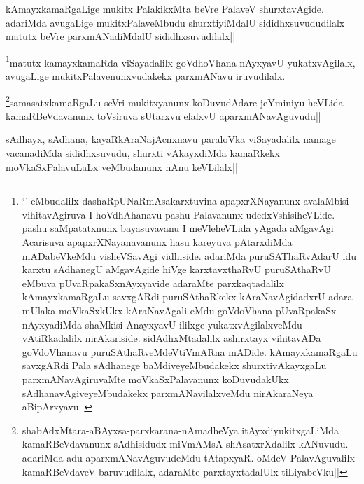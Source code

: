 
\begin{artha}
kAmayxkamaRgaLige mukitx PalakikxMta beVre PalaveV shurxtavAgide. adariMda avugaLige mukitxPalaveMbudu shurxtiyiMdalU sididhxsuvududilalx matutx beVre parxmANadiMdalU sididhxsuvudilalx||
\end{artha}

\begin{artha}
\footnote{`\stext' eMbudalilx dashaRpUNaRmAsakarxtuvina apapxrXNayanunx avalaMbisi vihitavAgiruva I hoVdhAhanavu pashu Palavanunx udedxVshisiheVLide. pashu saMpatatxnunx bayasuvavanu I meVleheVLida yAgada aMgavAgi Acarisuva apapxrXNayanavanunx hasu kareyuva pAtarxdiMda mADabeVkeMdu visheVSavAgi vidhiside. adariMda puruSAThaRvAdarU idu karxtu sAdhanegU aMgavAgide hiVge karxtavxthaRvU puruSAthaRvU eMbuva pUvaRpakaSxnAyxyavide adaraMte parxkaqtadalilx kAmayxkamaRgaLu savxgARdi puruSAthaRkekx kAraNavAgidadxrU adara mUlaka moVkaSxkUkx kAraNavAgali eMdu goVdoVhana pUvaRpakaSx nAyxyadiMda shaMkisi AnayxyavU ililxge yukatxvAgilalxveMdu vAtiRkadalilx nirAkariside. sidAdhxMtadalilx ashirxtayx vihitavADa goVdoVhanavu puruSAthaRveMdeVtiVmARna mADide. kAmayxkamaRgaLu savxgARdi Pala sAdhanege baMdiveyeMbudakekx shurxtivAkayxgaLu parxmANavAgiruvaMte moVkaSxPalavanunx koDuvudakUkx sAdhanavAgiveyeMbudakekx parxmANavilalxveMdu nirAkaraNeya aBipArxyavu||}matutx kamayxkamaRda viSayadalilx goVdhoVhana nAyxyavU yukatxvAgilalx, avugaLige mukitxPalavenunxvudakekx parxmANavu iruvudilalx.
\end{artha}


\begin{artha}
\footnote{shabAdxMtara-aBAyxsa-parxkarana-nAmadheVya itAyxdiyukitxgaLiMda kamaRBeVdavanunx sAdhisidudx miVmAMsA shAsatxrXdalilx kANuvudu. adariMda adu aparxmANavAguvudeMdu tAtapxyaR. oMdeV PalavAguvalilx kamaRBeVdaveV baruvudilalx, adaraMte parxtayxtadalUlx tiLiyabeVku||}samasatxkamaRgaLu seVri mukitxyanunx koDuvudAdare jeYminiyu heVLida kamaRBeVdavanunx toVsiruva sUtarxvu elalxvU aparxmANavAguvudu||
\end{artha}


\begin{artha}
sAdhayx, sAdhana, kayaRkAraNajAcnxnavu paraloVka viSayadalilx namage vacanadiMda sididhxsuvudu, shurxti vAkayxdiMda kamaRkekx moVkaSxPalavuLaLx veMbudanunx nAnu keVLilalx||
\end{artha}

